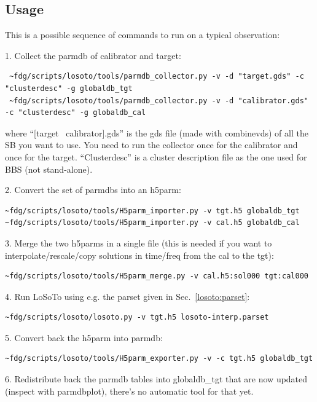\documentclass[]{article}
\begin{document}
\subsection{Usage}
\label{losoto:usage}

This is a possible sequence of commands to run \losoto{} on a typical observation:

1. Collect the parmdb of calibrator and target:
\begin{verbatim}
 ~fdg/scripts/losoto/tools/parmdb_collector.py -v -d "target.gds" -c "clusterdesc" -g globaldb_tgt
 ~fdg/scripts/losoto/tools/parmdb_collector.py -v -d "calibrator.gds" -c "clusterdesc" -g globaldb_cal
\end{verbatim}
where ``[target \textbar\ calibrator].gds'' is the gds file (made with combinevds) of all the SB you want to use. You need to run the collector once for the calibrator and once for the target. ``Clusterdesc'' is a cluster description file as the one used for BBS (not stand-alone).

2. Convert the set of parmdbs into an h5parm:
\begin{verbatim}
~fdg/scripts/losoto/tools/H5parm_importer.py -v tgt.h5 globaldb_tgt
~fdg/scripts/losoto/tools/H5parm_importer.py -v cal.h5 globaldb_cal
\end{verbatim}

3. Merge the two h5parms in a single file (this is needed if you want to interpolate/rescale/copy solutions in time/freq from the cal to the tgt):
\begin{verbatim}
~fdg/scripts/losoto/tools/H5parm_merge.py -v cal.h5:sol000 tgt:cal000
\end{verbatim}

4. Run LoSoTo using e.g. the parset given in Sec.~\ref{losoto:parset}:
\begin{verbatim}
~fdg/scripts/losoto/losoto.py -v tgt.h5 losoto-interp.parset
\end{verbatim}

5. Convert back the h5parm into parmdb:
\begin{verbatim}
~fdg/scripts/losoto/tools/H5parm_exporter.py -v -c tgt.h5 globaldb_tgt
\end{verbatim}

6. Redistribute back the parmdb tables into globaldb\_tgt that are now updated (inspect with parmdbplot), there's no automatic tool for that yet.

\end{document}
